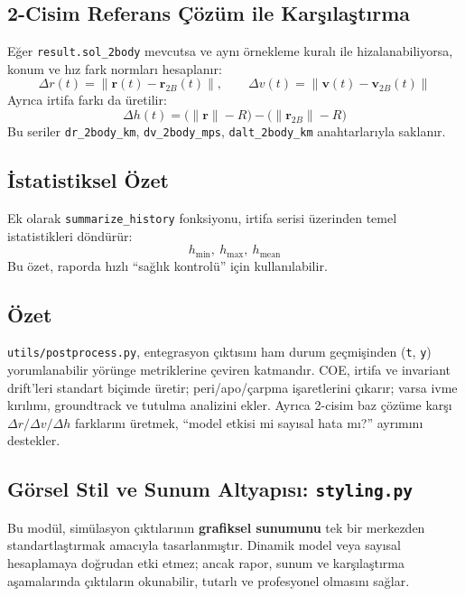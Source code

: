 \subsection*{2-Cisim Referans Çözüm ile Karşılaştırma}

Eğer \texttt{result.sol\_2body} mevcutsa ve aynı örnekleme kuralı ile hizalanabiliyorsa, konum ve hız fark normları hesaplanır:
\[
\Delta r(t)=\|\mathbf{r}(t)-\mathbf{r}_{2B}(t)\|,\qquad
\Delta v(t)=\|\mathbf{v}(t)-\mathbf{v}_{2B}(t)\|
\]
Ayrıca irtifa farkı da üretilir:
\[
\Delta h(t)=\big(\|\mathbf{r}\|-R\big)-\big(\|\mathbf{r}_{2B}\|-R\big)
\]
Bu seriler \texttt{dr\_2body\_km}, \texttt{dv\_2body\_mps}, \texttt{dalt\_2body\_km} anahtarlarıyla saklanır.


\subsection*{İstatistiksel Özet}

Ek olarak \texttt{summarize\_history} fonksiyonu,
irtifa serisi üzerinden temel istatistikleri döndürür:
\[
h_\text{min},\ h_\text{max},\ h_\text{mean}
\]
Bu özet, raporda hızlı “sağlık kontrolü” için kullanılabilir. 


\subsection*{Özet}

\texttt{utils/postprocess.py}, entegrasyon çıktısını
ham durum geçmişinden (\texttt{t}, \texttt{y})
yorumlanabilir yörünge metriklerine çeviren katmandır.
COE, irtifa ve invariant drift’leri standart biçimde üretir; 
peri/apo/çarpma işaretlerini çıkarır; 
varsa ivme kırılımı, groundtrack ve tutulma analizini ekler.
Ayrıca 2-cisim baz çözüme karşı $\Delta r / \Delta v / \Delta h$ farklarını üretmek, “model etkisi mi sayısal hata mı?” ayrımını destekler.



\newpage
\subsection{Görsel Stil ve Sunum Altyapısı: \texttt{styling.py}}
\label{subsec:styling}

Bu modül, simülasyon çıktılarının \textbf{grafiksel sunumunu}
tek bir merkezden standartlaştırmak amacıyla tasarlanmıştır.
Dinamik model veya sayısal hesaplamaya doğrudan etki etmez;
ancak rapor, sunum ve karşılaştırma aşamalarında
çıktıların okunabilir, tutarlı ve profesyonel olmasını sağlar.

